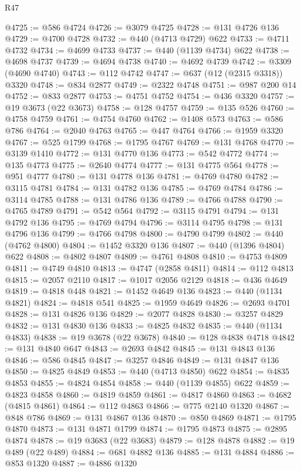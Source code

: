 \begin{lexlean}{R47}
\begin{coremodule}
@4725 := @586 @4724
@4726 := @3079 @4725
@4728 := @131 @4726 @136
@4729 := @4700 @4728
@4732 := @440 (@4713 @4729) @622
@4733 := @4711 @4732
@4734 := @4699 @4733
@4737 := @440 (@1139 @4734) @622
@4738 := @4698 @4737
@4739 := @4694 @4738
@4740 := @4692 @4739
@4742 := @3309 (@4690 @4740)
@4743 := @112 @4742
@4747 := @637 (@12 (@2315 @3318)) @3320
@4748 := @834 @2877
@4749 := @2322 @4748
@4751 := @987 @200 @14
@4752 := @833 @2877
@4753 := @4751 @4752
@4754 := @436 @3320
@4757 := @19 @3673 (@22 @3673)
@4758 := @128 @4757
@4759 := @135 @526
@4760 := @4758 @4759
@4761 := @4754 @4760
@4762 := @1408 @573
@4763 := @586 @786
@4764 := @2040 @4763
@4765 := @447 @4764
@4766 := @1959 @3320
@4767 := @525 @1799
@4768 := @1795 @4767
@4769 := @131 @4768
@4770 := @3139 @1410
@4772 := @131 @4770 @136
@4773 := @542 @4772
@4774 := @135 @4773
@4775 := @2640 @4774
@4777 := @131 @4775 @564
@4778 := @951 @4777
@4780 := @131 @4778 @136
@4781 := @4769 @4780
@4782 := @3115 @4781
@4784 := @131 @4782 @136
@4785 := @4769 @4784
@4786 := @3114 @4785
@4788 := @131 @4786 @136
@4789 := @4766 @4788
@4790 := @4765 @4789
@4791 := @542 @564
@4792 := @3115 @4791
@4794 := @131 @4792 @136
@4795 := @4769 @4794
@4796 := @3114 @4795
@4798 := @131 @4796 @136
@4799 := @4766 @4798
@4800 := @4790 @4799
@4802 := @440 (@4762 @4800)
@4804 := @1452 @3320 @136
@4807 := @440 (@1396 @4804) @622
@4808 := @4802 @4807
@4809 := @4761 @4808
@4810 := @4753 @4809
@4811 := @4749 @4810
@4813 := @4747 (@2858 @4811)
@4814 := @112 @4813
@4815 := @2057 @2110
@4817 := @1017 @2056 @2129
@4818 := @436 @4649
@4819 := @4818 @448
@4821 := @1452 @4649 @136
@4823 := @440 (@1134 @4821)
@4824 := @4818 @541
@4825 := @1959 @4649
@4826 := @2693 @4701
@4828 := @131 @4826 @136
@4829 := @2077 @4828
@4830 := @3257 @4829
@4832 := @131 @4830 @136
@4833 := @4825 @4832
@4835 := @440 (@1134 @4833)
@4838 := @19 @3678 (@22 @3678)
@4840 := @128 @4838 @4718
@4842 := @131 @4840 @647
@4843 := @2693 @4842
@4845 := @131 @4843 @136
@4846 := @586 @4845
@4847 := @3257 @4846
@4849 := @131 @4847 @136
@4850 := @4825 @4849
@4853 := @440 (@4713 @4850) @622
@4854 := @4835 @4853
@4855 := @4824 @4854
@4858 := @440 (@1139 @4855) @622
@4859 := @4823 @4858
@4860 := @4819 @4859
@4861 := @4817 @4860
@4863 := @4682 (@4815 @4861)
@4864 := @112 @4863
@4866 := @775 @2140 @1320
@4867 := @848 @786
@4869 := @131 @4867 @136
@4870 := @850 @4869
@4871 := @1795 @4870
@4873 := @131 @4871 @1799
@4874 := @1795 @4873
@4875 := @2895 @4874
@4878 := @19 @3683 (@22 @3683)
@4879 := @128 @4878
@4882 := @19 @489 (@22 @489)
@4884 := @681 @4882 @136
@4885 := @131 @4884
@4886 := @853 @1320
@4887 := @4886 @1320

\end{coremodule}
\end{lexlean}
